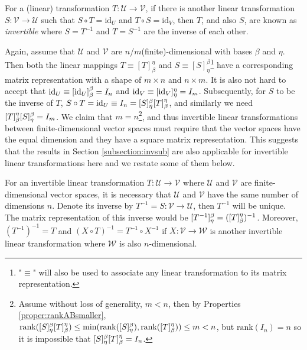 \begin{defn}
\label{defn:inversetrans}
For a (linear) transformation $T: \mathcal{U} \to \mathcal{V}$, if there is another linear transformation $S: \mathcal{V} \to \mathcal{U}$ such that $S \circ T = \text{id}_{U}$ and $T \circ S = \text{id}_{V}$, then $T$, and also $S$, are known as \textit{invertible} where $S = T^{-1}$ and $T = S^{-1}$ are the inverse of each other.
\end{defn}
Again, assume that $\mathcal{U}$ and $\mathcal{V}$ are $n$/$m$(finite)-dimensional with bases $\mathcal{\beta}$ and $\mathcal{\eta}$. Then both the linear mappings $T \equiv [T]_\beta^\eta$ and $S \equiv [S]_\eta^\beta$\footnote{"$\equiv$" will also be used to associate any linear transformation to its matrix representation.} have a corresponding matrix representation with a shape of $m \times n$ and $n \times m$. It is also not hard to accept that $\text{id}_U \equiv \smash{[\text{id}_U]_\beta^\beta} = I_n$ and $\text{id}_V \equiv \smash{[\text{id}_V]_\eta^\eta} = I_m$. Subsequently, for $S$ to be the inverse of $T$, $S \circ T = \text{id}_U \equiv I_n = \smash{[S]_\eta^\beta[T]_\beta^\eta}$, and similarly we need $\smash{[T]_\beta^\eta[S]_\eta^\beta} = I_m$. We claim that $m = n$\footnote{Assume without loss of generality, $m < n$, then by Properties \ref{proper:rankABsmaller}, $\text{rank}(\smash{[S]_\eta^\beta[T]_\beta^\eta}) \leq \min(\text{rank}(\smash{[S]_\eta^\beta}), \text{rank}(\smash{[T]_\beta^\eta})) \leq m < n$, but $\text{rank}(I_n) = n$ so it is impossible that $\smash{[S]_\eta^\beta[T]_\beta^\eta} = I_n$.}, and thus invertible linear transformations between finite-dimensional vector spaces must require that the vector spaces have the equal dimension and they have a square matrix representation. This suggests that the results in Section \ref{subsection:invsub} are also applicable for invertible linear transformations here and we restate some of them below.
\begin{proper}
For an invertible linear transformation $T: \mathcal{U} \to \mathcal{V}$ where $\mathcal{U}$ and $\mathcal{V}$ are finite-dimensional vector spaces, it is necessary that $\mathcal{U}$ and $\mathcal{V}$ have the same number of dimensions $n$. Denote its inverse by $T^{-1} = S: \mathcal{V} \to \mathcal{U}$, then $T^{-1}$ will be unique. The matrix representation of this inverse would be $\smash{[T^{-1}]_\eta^\beta} = \smash{([T]_\beta^\eta)^{-1}}$. Moreover, $(T^{-1})^{-1} = T$ and $(X \circ T)^{-1} = T^{-1} \circ X^{-1}$ if $X:\mathcal{V} \to \mathcal{W}$ is another invertible linear transformation where $\mathcal{W}$ is also $n$-dimensional.
\end{proper}

